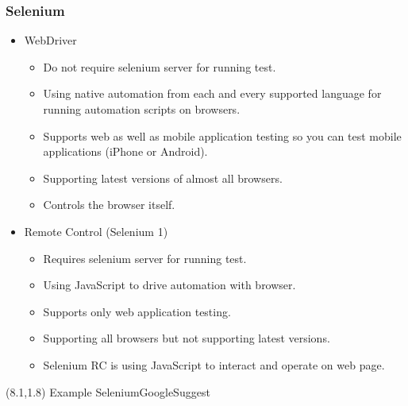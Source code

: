 \documentclass[10pt,xcolor=pdflatex]{beamer}
\begin{document}
\begin{frame}\frametitle{Selenium}
\begin{itemize}
  \item WebDriver
    \begin{itemize}
    	\item Do not require selenium server for running test.
		\item Using native automation from each and every supported language for running automation scripts on browsers.
		\item Supports web as well as mobile application testing so you can test mobile applications (iPhone or Android).
		\item Supporting latest versions of almost all browsers.
		\item Controls the browser itself.
    \end{itemize}
  \item Remote Control (Selenium 1)
    \begin{itemize}
      \item Requires selenium server for running test.
	  \item Using JavaScript to drive automation with browser.
	  \item Supports only web application testing.
	  \item Supporting all browsers but not supporting latest versions.
	  \item Selenium RC is using JavaScript to interact and operate on web page.
    \end{itemize}
\end{itemize}
\begin{textblock}{10}(8.1,1.8)
    {\footnotesize Example SeleniumGoogleSuggest}
\end{textblock}
\end{frame}
\end{document}
